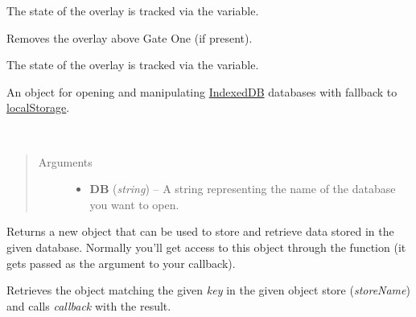 \documentclass[letterpaper,10pt,openany]{sphinxmanual}
\begin{document}
\begin{fulllineitems}
\begin{fulllineitems}
\begin{fulllineitems}
The state of the overlay is tracked via the  variable.

\end{fulllineitems}



\begin{fulllineitems}
\label{Developer/js_gateone:GateOne.Visual.disableOverlay}
Removes the overlay above Gate One (if present).

The state of the overlay is tracked via the  variable.

\end{fulllineitems}


\end{fulllineitems}



\begin{fulllineitems}
\label{Developer/js_gateone:GateOne.Storage}
An object for opening and manipulating \href{https://developer.mozilla.org/en-US/docs/IndexedDB}{IndexedDB} databases with fallback to \href{https://developer.mozilla.org/en-US/docs/Web/Guide/DOM/Storage\#localStorage}{localStorage}.


\begin{fulllineitems}
\label{Developer/js_gateone:GateOne.Storage.dbObject}~\begin{quote}\begin{description}
\item[{Arguments}] \leavevmode\begin{itemize}
\item {} 
\textbf{DB} (\emph{string}) -- A string representing the name of the database you want to open.

\end{itemize}

\end{description}\end{quote}

Returns a new object that can be used to store and retrieve data stored in the given database.  Normally you'll get access to this object through the {\hyperref[Developer/js_gateone:GateOne.Storage.openDB]{}} function (it gets passed as the argument to your callback).


\begin{fulllineitems}
\label{Developer/js_gateone:GateOne.Storage.dbObject.get}
Retrieves the object matching the given \emph{key} in the given object store (\emph{storeName}) and calls \emph{callback} with the result.


\end{fulllineitems}
\end{fulllineitems}
\end{fulllineitems}
\end{fulllineitems}
\end{document}
